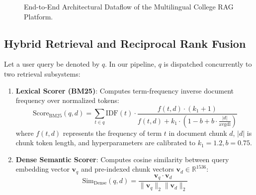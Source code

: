 \documentclass[conference]{IEEEtran}
\begin{document}
\begin{figure}[htbp]
\centering
{}
\caption{End-to-End Architectural Dataflow of the Multilingual College RAG Platform.}
\label{fig:architecture}
\end{figure}

\subsection{Hybrid Retrieval and Reciprocal Rank Fusion}
Let a user query be denoted by $q$. In our pipeline, $q$ is dispatched concurrently to two retrieval subsystems:
\begin{enumerate}
    \item \textbf{Lexical Scorer (BM25)}: Computes term-frequency inverse document frequency over normalized tokens:
    \begin{equation}
    \text{Score}_{\text{BM25}}(q, d) = \sum_{t \in q} \text{IDF}(t) \cdot \frac{f(t, d) \cdot (k_1 + 1)}{f(t, d) + k_1 \cdot \left(1 - b + b \cdot \frac{|d|}{\text{avgdl}}\right)}
    \end{equation}
    where $f(t, d)$ represents the frequency of term $t$ in document chunk $d$, $|d|$ is chunk token length, and hyperparameters are calibrated to $k_1 = 1.2, b = 0.75$.
    \item \textbf{Dense Semantic Scorer}: Computes cosine similarity between query embedding vector $\mathbf{v}_q$ and pre-indexed chunk vectors $\mathbf{v}_d \in \mathbb{R}^{1536}$:
    \begin{equation}
    \text{Sim}_{\text{Dense}}(q, d) = \frac{\mathbf{v}_q \cdot \mathbf{v}_d}{\|\mathbf{v}_q\|_2 \|\mathbf{v}_d\|_2}
    \end{equation}
\end{enumerate}
\end{document}
